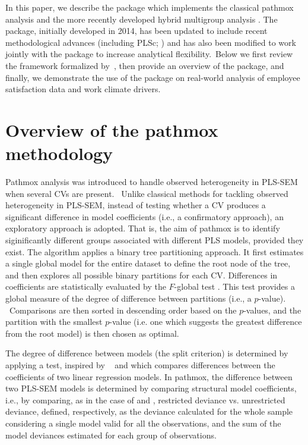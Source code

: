 In this paper, we describe the  package \citep{genpathmox} which implements the classical pathmox analysis and the more recently developed hybrid multigroup analysis \citep{Lamberti21}. The package, initially developed in 2014,  has been updated to include recent methodological advances (including PLSc;  \citealp{Dijkstra15}) and has also been modified to work jointly with the   package to increase analytical flexibility. Below we first review the framework formalized by \citet{Lamberti16}, then provide an overview of the  package, and finally, we demonstrate the use of the package on real-world analysis of employee satisfaction data and work climate drivers.

\section{Overview of the pathmox methodology}

Pathmox analysis  \citep{Lamberti16, Lamberti17} was introduced to handle observed heterogeneity in PLS-SEM when several CVs are present.  Unlike classical methods for tackling observed heterogeneity in PLS-SEM, instead of testing whether a CV produces a significant difference in model coefficients (i.e., a confirmatory approach),  an exploratory approach is adopted. That is, the aim of pathmox is to identify siginificantly different groups associated with different PLS models, provided they exist. The algorithm applies a binary tree partitioning approach. It first estimates a single global model for the entire dataset to define the root node of the tree, and then explores all possible binary partitions for each CV. Differences in coefficients are statistically evaluated by the $F$-global test  \citep{Lamberti16}. This test provides a global measure of the degree of difference between partitions (i.e., a $p$-value).  Comparisons are then sorted  in descending order based on the $p$-values, and the partition with the smallest $p$-value (i.e. one which suggests the greatest difference from the root model) is then chosen as optimal. 

The degree of difference between models (the split criterion) is determined by applying a test, inspired by  \citet{Chow60} and \citet{Lebart79} which compares differences between the coefficients of two linear regression models. In pathmox, the difference between two PLS-SEM models is determined by comparing structural model coefficients, i.e., by comparing, as in the case of \citet{Chow60} and \citet{Lebart79}, restricted deviance vs. unrestricted deviance, defined, respectively, as the deviance calculated for the whole sample considering a single model valid for all the observations, and the sum of the model deviances estimated for each group of observations.  

